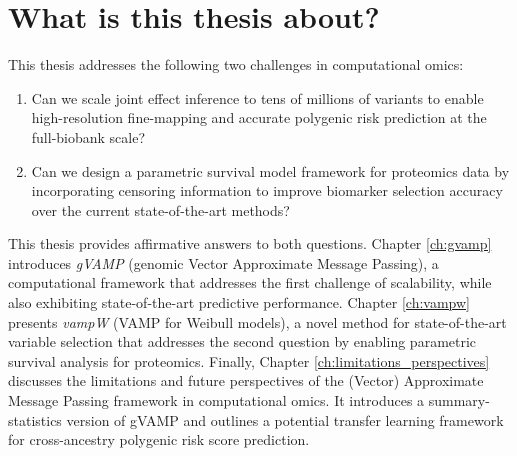 \section{What is this thesis about?}
This thesis addresses the following two challenges in computational omics:
\begin{enumerate}
	\item Can we scale joint effect inference to tens of millions of variants to enable high-resolution fine-mapping and accurate polygenic risk prediction at the full-biobank scale? 
	\item Can we design a parametric survival model framework for proteomics data by incorporating censoring information to improve biomarker selection accuracy over the current state-of-the-art methods?
\end{enumerate}

This thesis provides affirmative answers to both questions. Chapter \ref{ch:gvamp} introduces \textit{gVAMP} (genomic Vector Approximate Message Passing), a computational framework that addresses the first challenge of scalability, while also exhibiting state-of-the-art predictive performance. Chapter \ref{ch:vampw} presents \textit{vampW} (VAMP for Weibull models), a novel method for state-of-the-art variable selection that addresses the second question by enabling parametric survival analysis for proteomics. Finally, Chapter \ref{ch:limitations_perspectives} discusses the limitations and future perspectives of the (Vector) Approximate Message Passing framework in computational omics. It introduces a summary-statistics version of gVAMP and outlines a potential transfer learning framework for cross-ancestry polygenic risk score prediction.
